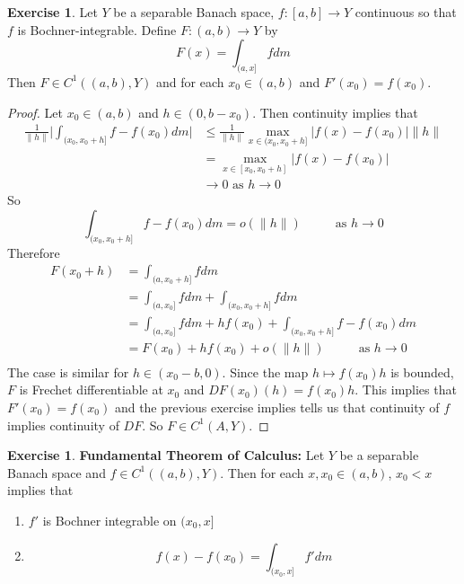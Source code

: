 \documentclass[12pt]{amsart}
\theoremstyle{definition}
\theoremstyle{remark}
\theoremstyle{definition}
\newtheorem{ex}[definition]{Exercise}
\begin{document}
	\begin{ex}
	Let $Y$ be a separable Banach space, $f:[a,b] \rightarrow Y$ continuous so that $f$ is Bochner-integrable. Define $F:(a,b) \rightarrow Y$ by  $$F(x) = \int_{(a, x]}f dm$$ Then $F \in C^1((a,b), Y)$ and for each $x_0 \in (a,b)$ and $F'(x_0) = f(x_0)$.
	\end{ex}
	
	\begin{proof}
	Let $x_0 \in (a,b)$ and $h \in (0, b-x_0)$. Then continuity implies that
	\begin{align*}
	\frac{1}{\|h\|} \bigg | \int_{(x_0, x_0 + h]}f - f(x_0) dm \bigg |
	& \leq  \frac{1}{\|h\|} \max_{x \in (x_0, x_0+h]} |f(x) - f(x_0)| \|h\| \\
	&= \max_{x \in [x_0, x_0+h]} |f(x) - f(x_0)| \\
	& \rightarrow 0  \text{ as } h \rightarrow 0
\end{align*}	  
So $$\int_{(x_0, x_0 + h]}f - f(x_0) dm = o(\|h\|) \hspace{1cm}\text{ as }h \rightarrow 0$$ 
	Therefore 
	\begin{align*}
	F(x_0 + h)
	&= \int_{(a, x_0 + h]} f dm  \\
	&= \int_{(a, x_0]} f dm + \int_{(x_0, x_0 + h]} fdm \\
	&= \int_{(a, x_0]} f dm + hf(x_0) + \int_{(x_0, x_0 + h]} f - f(x_0) dm \\ 
	&= F(x_0 ) + hf(x_0) + o(\|h\|) \hspace{1cm }\text{ as } h \rightarrow 0\\
	\end{align*}
	The case is similar for $h \in (x_0 - b, 0)$. Since the map $h \mapsto f(x_0)h$ is bounded, $F$ is Frechet differentiable at $x_0$ and $DF(x_0)(h) = f(x_0)h$. This implies that $F'(x_0) = f(x_0)$ and the previous exercise implies tells us that continuity of $f$ implies continuity of $DF$. So $F \in C^1(A, Y)$.
	\end{proof}
	
	\begin{ex}\textbf{Fundamental Theorem of Calculus:}
	Let $Y$ be a separable Banach space and $f \in C^1((a,b), Y)$. Then for each $x, x_0 \in (a,b)$, $x_0 < x$ implies that 
	\begin{enumerate}
	\item $f'$ is Bochner integrable on $(x_0, x]$ 
	\item  $$f(x) - f(x_0) = \int_{(x_0, x]}f'dm$$ 
	\end{enumerate}
	\end{ex}
\end{document}
